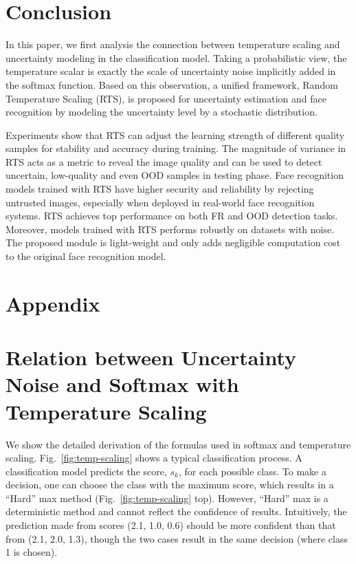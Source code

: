 \documentclass[letterpaper]{article} %
\begin{document}
\section{Conclusion}
\label{sec:conclusion}

In this paper, we first analysis the connection between temperature scaling and uncertainty modeling in the classification model. Taking a probabilistic view, the temperature scalar is exactly the scale of uncertainty noise implicitly added in the softmax function. Based on this observation, a unified framework, Random Temperature Scaling (RTS), is proposed for uncertainty estimation and face recognition by modeling the uncertainty level by a stochastic distribution. 

Experiments show that RTS can adjust the learning strength of different quality samples for stability and accuracy during training. The magnitude of variance in RTS acts as a metric to reveal the image quality and can be used to detect uncertain, low-quality and even OOD samples in testing phase. 
Face recognition models trained with RTS have higher security and reliability by rejecting untrusted images, especially when deployed in real-world face recognition systems. RTS achieves top performance on both FR and OOD detection tasks. Moreover, models trained with RTS performs robustly on datasets with noise. The proposed module is light-weight and only adds negligible computation cost to the original face recognition model.


\section*{Appendix}
\appendix
\section{Relation between Uncertainty Noise and Softmax with Temperature Scaling}
We show the detailed derivation of the formulas used in softmax and temperature scaling.
%
Fig.~\ref{fig:temp-scaling} shows a typical classification process. A classification model predicts the score, $s_k$, for each possible class. To make a decision, one can choose the class with the maximum score, which results in a ``Hard'' max method (Fig.~\ref{fig:temp-scaling} top).
%
However, ``Hard'' max is a deterministic method and cannot reflect the confidence of results. Intuitively, the prediction made from scores (2.1, 1.0, 0.6) should be more confident than that from (2.1, 2.0, 1.3), though the two cases result in the same decision (where class 1 is chosen). 
\end{document}

